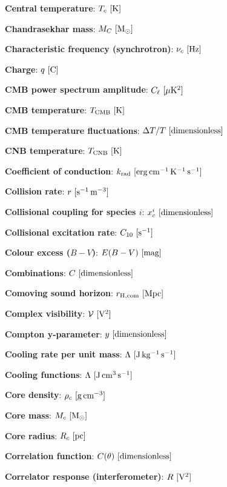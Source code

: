 \documentclass[a4paper,10pt]{article}
\begin{document}
{\noindent}\textbf{Central temperature}: $T_c ~ [{\rm K}]$

{\noindent}\textbf{Chandrasekhar mass}: $M_C ~ [{\rm M_\odot}]$

{\noindent}\textbf{Characteristic frequency (synchrotron)}: $\nu_c ~ [{\rm Hz}]$

{\noindent}\textbf{Charge}: $q ~ [{\rm C}]$

{\noindent}\textbf{CMB power spectrum amplitude}: $C_\ell ~ [{\rm \mu K^2}]$

{\noindent}\textbf{CMB temperature}: $T_\mathrm{CMB} ~ [{\rm K}]$

{\noindent}\textbf{CMB temperature fluctuations}: $\Delta T/T ~ [{\rm dimensionless}]$

{\noindent}\textbf{CNB temperature}: $T_\mathrm{CNB} ~ [{\rm K}]$

{\noindent}\textbf{Coefficient of conduction}: $k_{\rm rad} ~ [{\rm erg\,cm^{-1}\,K^{-1}\,s^{-1}}]$

{\noindent}\textbf{Collision rate}: $r ~ [{\rm s^{-1}\,m^{-3}}]$

{\noindent}\textbf{Collisional coupling for species $i$}: $x_c^i ~ [{\rm dimensionless}]$

{\noindent}\textbf{Collisional excitation rate}: $C_{10} ~ [{\rm s^{-1}}]$

{\noindent}\textbf{Colour excess ($B-V$)}: $E(B-V) ~ [{\rm mag}]$

{\noindent}\textbf{Combinations}: $C ~ [{\rm dimensionless}]$

{\noindent}\textbf{Comoving sound horizon}: $r_\mathrm{H,com} ~ [{\rm Mpc}]$

{\noindent}\textbf{Complex visibility}: $\mathcal{V} ~ [{\rm V^2}]$

{\noindent}\textbf{Compton y-parameter}: $y ~ [{\rm dimensionless}]$

{\noindent}\textbf{Cooling rate per unit mass}: $\Lambda ~ [{\rm J\,kg^{-1}\,s^{-1}}]$

{\noindent}\textbf{Cooling functions}: $\Lambda ~ [{\rm J\,cm^3\,s^{-1}}]$

{\noindent}\textbf{Core density}: $\rho_c ~ [{\rm g\,cm^{-3}}]$

{\noindent}\textbf{Core mass}: $M_c ~ [{\rm M_\odot}]$

{\noindent}\textbf{Core radius}: $R_c ~ [{\rm pc}]$

{\noindent}\textbf{Correlation function}: $C(\theta) ~ [{\rm dimensionless}]$

{\noindent}\textbf{Correlator response (interferometer)}: $R ~ [{\rm V^2}]$
\end{document}
